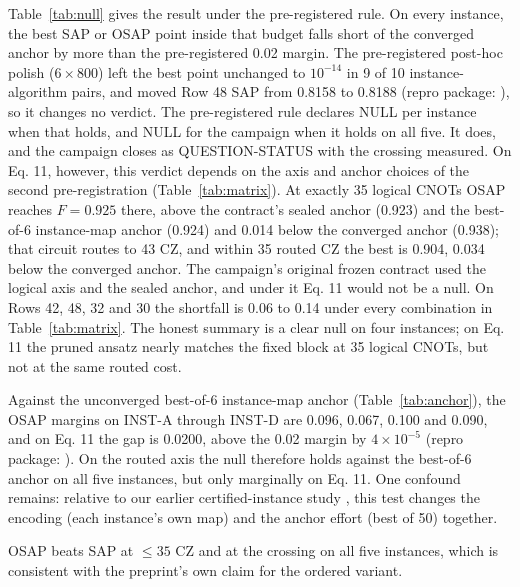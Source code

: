 \documentclass[11pt]{article}
\begin{document}
Table~\ref{tab:null} gives the result under the pre-registered rule. On every instance, the best SAP or OSAP point inside that budget falls short of the converged anchor by more than the pre-registered 0.02 margin. The pre-registered post-hoc polish ($6 \times 800$) left the best point unchanged to $10^{-14}$ in 9 of 10 instance-algorithm pairs, and moved Row 48 SAP from 0.8158 to 0.8188 (repro package: ), so it changes no verdict. The pre-registered rule declares NULL per instance when that holds, and NULL for the campaign when it holds on all five. It does, and the campaign closes as QUESTION-STATUS with the crossing measured. On Eq. 11, however, this verdict depends on the axis and anchor choices of the second pre-registration (Table~\ref{tab:matrix}). At exactly 35 logical CNOTs OSAP reaches $F = 0.925$ there, above the contract's sealed anchor (0.923) and the best-of-6 instance-map anchor (0.924) and 0.014 below the converged anchor (0.938); that circuit routes to 43 CZ, and within 35 routed CZ the best is 0.904, 0.034 below the converged anchor. The campaign's original frozen contract used the logical axis and the sealed anchor, and under it Eq. 11 would not be a null. On Rows 42, 48, 32 and 30 the shortfall is 0.06 to 0.14 under every combination in Table~\ref{tab:matrix}. The honest summary is a clear null on four instances; on Eq. 11 the pruned ansatz nearly matches the fixed block at 35 logical CNOTs, but not at the same routed cost.

Against the unconverged best-of-6 instance-map anchor (Table~\ref{tab:anchor}), the OSAP margins on INST-A through INST-D are 0.096, 0.067, 0.100 and 0.090, and on Eq. 11 the gap is 0.0200, above the 0.02 margin by $4\times 10^{-5}$ (repro package: ). On the routed axis the null therefore holds against the best-of-6 anchor on all five instances, but only marginally on Eq. 11. One confound remains: relative to our earlier certified-instance study \cite{dongo2026instances}, this test changes the encoding (each instance's own map) and the anchor effort (best of 50) together.

OSAP beats SAP at $\leq 35$ CZ and at the crossing on all five instances, which is consistent with the preprint's own claim for the ordered variant.
\end{document}
